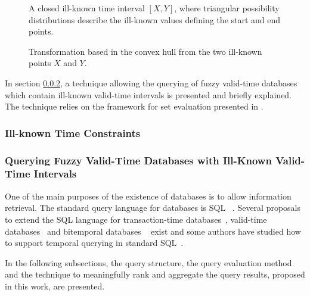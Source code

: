 
\begin{figure}
\centering

\caption{A closed ill-known time interval $\left[X, Y\right]$, where triangular possibility distributions describe the ill-known values defining the start and end points.}
\label{fig:interval}
\end{figure}

\begin{figure}
\centering

\caption{Transformation based in the convex hull from the two ill-known points $X$ and $Y$. }
\label{fig:convexhull}
\end{figure}

In section \ref{subsec:querying-time-intervals}, a technique allowing the querying of fuzzy valid-time databases which contain ill-known valid-time intervals is presented and briefly explained. The technique relies on the framework for set evaluation presented in \cite{Pon11}.

\subsubsection{Ill-known Time Constraints}

\subsubsection{Querying Fuzzy Valid-Time Databases with Ill-Known Valid-Time Intervals}
\label{subsec:querying-time-intervals}

One of the main purposes of the existence of databases is to allow information retrieval. The standard query language for databases is SQL ~\cite{Mel93}. Several proposals to extend the SQL language for transaction-time databases~\cite{Sarda90}, valid-time databases~\cite{gad92} and bitemporal databases ~\cite{TSQL} exist and some authors have studied how to support temporal querying in standard SQL~\cite{Snodgrass98}.

In the following subsections, the query structure, the query evaluation method and the technique to meaningfully rank and aggregate the query results, proposed in this work, are presented. 

